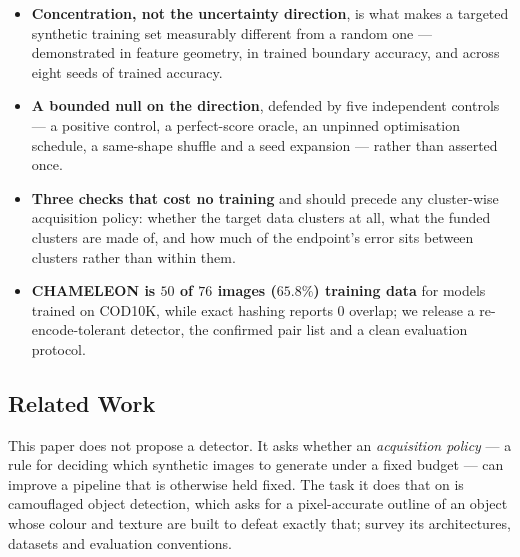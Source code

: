 \documentclass{article} %
\begin{document}
\begin{itemize}
\itemsep0.04em
\item \textbf{Concentration, not the uncertainty direction}, is what makes a targeted synthetic
training set measurably different from a random one --- demonstrated in feature geometry, in trained
boundary accuracy, and across eight seeds of trained accuracy.
\item \textbf{A bounded null on the direction}, defended by five independent controls --- a positive
control, a perfect-score oracle, an unpinned optimisation schedule, a same-shape shuffle and a seed
expansion --- rather than asserted once.
\item \textbf{Three checks that cost no training} and should precede any cluster-wise acquisition
policy: whether the target data clusters at all, what the funded clusters are made of, and how much
of the endpoint's error sits between clusters rather than within them.
\item \textbf{CHAMELEON is $50$ of $76$ images ($65.8\%$) training data} for models trained on
COD10K, while exact hashing reports $0$ overlap; we release a re-encode-tolerant detector, the
confirmed pair list and a clean evaluation protocol.
\end{itemize}

\subsection{Related Work}
\label{sec:related}
This paper does not propose a detector. It asks whether an \emph{acquisition policy} --- a rule for
deciding which synthetic images to generate under a fixed budget --- can improve a pipeline that is
otherwise held fixed. The task it does that on is camouflaged object detection, which asks for a
pixel-accurate outline of an object whose colour and texture are built to defeat exactly that;
\citet{fan2023advances} survey its architectures, datasets and evaluation conventions.
\end{document}
